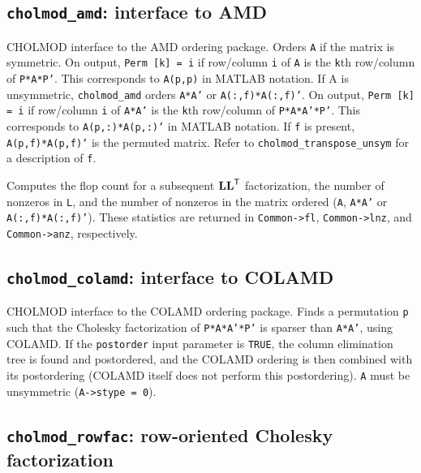 \documentclass[11pt]{article}
\newcommand{\m}[1]{{\bf{#1}}}       %
\newcommand{\tr}{^{\sf T}}          %
\begin{document}
\newpage \subsection{{\tt cholmod\_amd}: interface to AMD}


CHOLMOD interface to the AMD ordering package.  Orders {\tt A} if the matrix is
symmetric.  On output, {\tt Perm [k] = i} if row/column {\tt i} of {\tt A} is the {\tt k}th
row/column of {\tt P*A*P'}.  This corresponds to {\tt A(p,p)} in MATLAB notation.
If A is unsymmetric, {\tt cholmod\_amd} orders {\tt A*A'} or {\tt A(:,f)*A(:,f)'}.
On output, {\tt Perm [k] = i} if
row/column {\tt i} of {\tt A*A'} is the {\tt k}th row/column of {\tt P*A*A'*P'}.
This corresponds to {\tt A(p,:)*A(p,:)'} in MATLAB notation.
If {\tt f} is present, {\tt A(p,f)*A(p,f)'} is the permuted matrix.
Refer to {\tt cholmod\_transpose\_unsym} for a description of {\tt f}.

Computes the flop count for a subsequent $\m{LL}\tr$ factorization, the number
of nonzeros in {\tt L}, and the number of nonzeros in the matrix ordered
({\tt A}, {\tt A*A'} or {\tt A(:,f)*A(:,f)'}).
These statistics are returned in
{\tt Common->fl}, {\tt Common->lnz}, and {\tt Common->anz}, respectively.

\subsection{{\tt cholmod\_colamd}: interface to COLAMD}


CHOLMOD interface to the COLAMD ordering package.
Finds a permutation {\tt p} such that the Cholesky factorization of {\tt P*A*A'*P'} is
sparser than {\tt A*A'}, using COLAMD.  If the {\tt postorder} input parameter is {\tt TRUE},
the column elimination tree is found and postordered, and the COLAMD ordering is then
combined with its postordering (COLAMD itself does not perform this postordering).
{\tt A} must be unsymmetric ({\tt A->stype = 0}).

\newpage \subsection{{\tt cholmod\_rowfac}: row-oriented Cholesky factorization}
\end{document}
